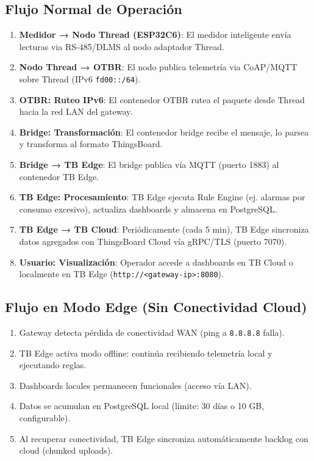\subsection{Flujo Normal de Operación}

\begin{enumerate}
    \item \textbf{Medidor → Nodo Thread (ESP32C6)}: El medidor inteligente envía lecturas via RS-485/DLMS al nodo adaptador Thread.
    \item \textbf{Nodo Thread → OTBR}: El nodo publica telemetría via CoAP/MQTT sobre Thread (IPv6 \texttt{fd00::/64}).
    \item \textbf{OTBR: Ruteo IPv6}: El contenedor OTBR rutea el paquete desde Thread hacia la red LAN del gateway.
    \item \textbf{Bridge: Transformación}: El contenedor bridge recibe el mensaje, lo parsea y transforma al formato ThingsBoard.
    \item \textbf{Bridge → TB Edge}: El bridge publica vía MQTT (puerto 1883) al contenedor TB Edge.
    \item \textbf{TB Edge: Procesamiento}: TB Edge ejecuta Rule Engine (ej. alarmas por consumo excesivo), actualiza dashboards y almacena en PostgreSQL.
    \item \textbf{TB Edge → TB Cloud}: Periódicamente (cada 5 min), TB Edge sincroniza datos agregados con ThingsBoard Cloud vía gRPC/TLS (puerto 7070).
    \item \textbf{Usuario: Visualización}: Operador accede a dashboards en TB Cloud o localmente en TB Edge (\texttt{http://<gateway-ip>:8080}).
\end{enumerate}

\subsection{Flujo en Modo Edge (Sin Conectividad Cloud)}

\begin{enumerate}
    \item Gateway detecta pérdida de conectividad WAN (ping a \texttt{8.8.8.8} falla).
    \item TB Edge activa modo offline: continúa recibiendo telemetría local y ejecutando reglas.
    \item Dashboards locales permanecen funcionales (acceso vía LAN).
    \item Datos se acumulan en PostgreSQL local (límite: 30 días o 10 GB, configurable).
    \item Al recuperar conectividad, TB Edge sincroniza automáticamente backlog con cloud (chunked uploads).
\end{enumerate}

